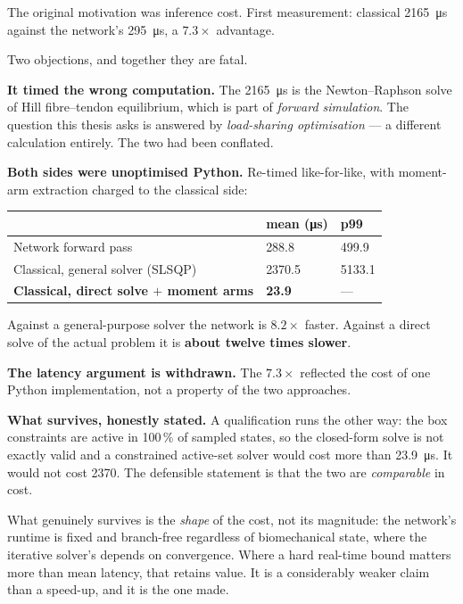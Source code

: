 The original motivation was inference cost. First measurement: classical
\SI{2165}{\micro\second} against the network's \SI{295}{\micro\second}, a
$7.3\times$ advantage.

\begin{trap}
Two objections, and together they are fatal.

\textbf{It timed the wrong computation.} The \SI{2165}{\micro\second} is the
Newton--Raphson solve of Hill fibre--tendon equilibrium, which is part of
\emph{forward simulation}. The question this thesis asks is answered by
\emph{load-sharing optimisation} --- a different calculation entirely. The two had
been conflated.

\textbf{Both sides were unoptimised Python.} Re-timed like-for-like, with
moment-arm extraction charged to the classical side:

\begin{center}
\begin{tabular}{@{} L{7.6cm} R{2.4cm} R{2.4cm} @{}}
\toprule
& \textbf{mean (\si{\micro\second})} & \textbf{p99} \\
\midrule
Network forward pass & 288.8 & 499.9 \\
Classical, general solver (SLSQP) & 2370.5 & 5133.1 \\
\textbf{Classical, direct solve $+$ moment arms} & \textbf{23.9} & --- \\
\bottomrule
\end{tabular}
\end{center}

Against a general-purpose solver the network is $8.2\times$ faster. Against a
direct solve of the actual problem it is \textbf{about twelve times slower}.

\textbf{The latency argument is withdrawn.} The $7.3\times$ reflected the cost of
one Python implementation, not a property of the two approaches.
\end{trap}

\textbf{What survives, honestly stated.} A qualification runs the other way: the
box constraints are active in 100\,\% of sampled states, so the closed-form solve
is not exactly valid and a constrained active-set solver would cost more than
\SI{23.9}{\micro\second}. It would not cost \SI{2370}{}. The defensible statement
is that the two are \emph{comparable} in cost.

What genuinely survives is the \emph{shape} of the cost, not its magnitude: the
network's runtime is fixed and branch-free regardless of biomechanical state,
where the iterative solver's depends on convergence. Where a hard real-time bound
matters more than mean latency, that retains value. It is a considerably weaker
claim than a speed-up, and it is the one made.

